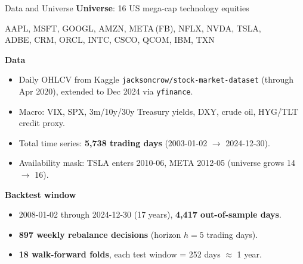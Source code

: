 \documentclass[10pt, aspectratio=169]{beamer}
\begin{document}
\begin{frame}{Data and Universe}
\textbf{Universe}: 16 US mega-cap technology equities
\begin{center}\footnotesize
AAPL, MSFT, GOOGL, AMZN, META\,(FB), NFLX, NVDA, TSLA,\\
ADBE, CRM, ORCL, INTC, CSCO, QCOM, IBM, TXN
\end{center}
\vspace{-0.3em}
\textbf{Data}
\begin{itemize}\setlength{\itemsep}{2pt}
  \item Daily OHLCV from Kaggle \texttt{jacksoncrow/stock-market-dataset} (through Apr 2020),
        extended to Dec 2024 via \texttt{yfinance}.
  \item Macro: VIX, SPX, 3m/10y/30y Treasury yields, DXY, crude oil, HYG/TLT credit proxy.
  \item Total time series: \textbf{5{,}738 trading days} (2003-01-02 $\to$ 2024-12-30).
  \item Availability mask: TSLA enters 2010-06, META 2012-05 (universe grows 14 $\to$ 16).
\end{itemize}
\vspace{0.1em}
\textbf{Backtest window}
\begin{itemize}\setlength{\itemsep}{2pt}
  \item 2008-01-02 through 2024-12-30 (17 years), \textbf{4{,}417 out-of-sample days}.
  \item \textbf{897 weekly rebalance decisions} (horizon $h=5$ trading days).
  \item \textbf{18 walk-forward folds}, each test window = 252 days $\approx$ 1 year.
\end{itemize}
\end{frame}
\end{document}
